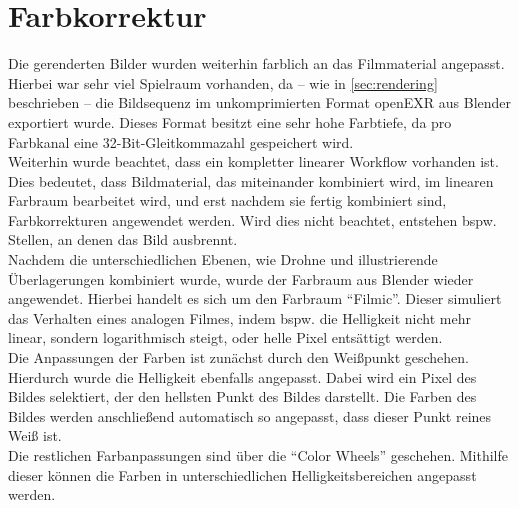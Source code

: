 
\section{Farbkorrektur}

Die gerenderten Bilder wurden weiterhin farblich an das Filmmaterial angepasst. Hierbei war sehr viel Spielraum vorhanden, da -- wie in \autoref{sec:rendering} beschrieben -- die Bildsequenz im unkomprimierten Format openEXR aus Blender exportiert wurde. Dieses Format besitzt eine sehr hohe Farbtiefe, da pro Farbkanal eine 32-Bit-Gleitkommazahl gespeichert wird. \\
Weiterhin wurde beachtet, dass ein kompletter linearer Workflow vorhanden ist. Dies bedeutet, dass Bildmaterial, das miteinander kombiniert wird, im linearen Farbraum bearbeitet wird, und erst nachdem sie fertig kombiniert sind, Farbkorrekturen angewendet werden. Wird dies nicht beachtet, entstehen bspw. Stellen, an denen das Bild ausbrennt. \\
Nachdem die unterschiedlichen Ebenen, wie Drohne und illustrierende Überlagerungen kombiniert wurde, wurde der Farbraum aus Blender wieder angewendet. Hierbei handelt es sich um den Farbraum ``Filmic''. Dieser simuliert das Verhalten eines analogen Filmes, indem bspw. die Helligkeit nicht mehr linear, sondern logarithmisch steigt, oder helle Pixel entsättigt werden. \\
Die Anpassungen der Farben ist zunächst durch den Weißpunkt geschehen. Hierdurch wurde die Helligkeit ebenfalls angepasst. Dabei wird ein Pixel des Bildes selektiert, der den hellsten Punkt des Bildes darstellt. Die Farben des Bildes werden anschließend automatisch so angepasst, dass dieser Punkt reines Weiß ist.\\
Die restlichen Farbanpassungen sind über die ``Color Wheels'' geschehen. Mithilfe dieser können die Farben in unterschiedlichen Helligkeitsbereichen angepasst werden. 


